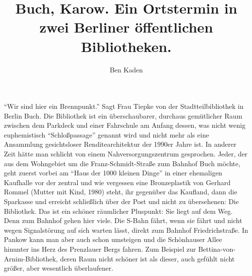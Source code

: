 \documentclass[a4paper,
fontsize=11pt,
oneside,
numbers=noperiodatend,
parskip=half-,
bibliography=totoc,
final
]{scrartcl}
\title{\LARGE{Buch, Karow. Ein Ortstermin in zwei Berliner öffentlichen Bibliotheken.}} %
\author{Ben Kaden} %
\date{}
\begin{document}
\maketitle
\thispagestyle{fancyplain} 


\enquote{Wir sind hier ein Brennpunkt.} Sagt Frau Tiepke von der
Stadtteilbibliothek in Berlin Buch. Die Bibliothek ist ein
überschaubarer, durchaus gemütlicher Raum zwischen dem Parkdeck und
einer Fahrschule am Anfang dessen, was nicht wenig euphemistisch
\enquote{Schloßpassage} genannt wird und nicht mehr als eine Ansammlung
gesichtsloser Renditearchitektur der 1990er Jahre ist. In anderer Zeit
hätte man schlicht von einem Nahversorgungszentrum gesprochen. Jeder,
der aus dem Wohngebiet um die Franz-Schmidt-Straße zum Bahnhof Buch
möchte, geht zuerst vorbei am \enquote{Haus der 1000 kleinen Dinge} in
einer ehemaligen Kaufhalle vor der zentral und wie vergessen eine
Bronzeplastik von Gerhard Rommel (Mutter mit Kind, 1980) steht, ihr
gegenüber das Kaufland, dann die Sparkasse und erreicht schließlich über
der Post und nicht zu übersehenen: Die Bibliothek. Das ist ein schöner
räumlicher Pluspunkt: Sie liegt auf dem Weg. Denn zum Bahnhof gehen hier
viele. Die S-Bahn fährt, wenn sie fährt und nicht wegen Signalstörung
auf sich warten lässt, direkt zum Bahnhof Friedrichstraße. In Pankow
kann man aber auch schon umsteigen und die Schönhauser Allee hinunter
ins Herz des Prenzlauer Bergs fahren. Zum Beispiel zur
Bettina-von-Arnim-Bibliothek, deren Raum nicht schöner ist als dieser,
auch gefühlt nicht größer, aber wesentlich überlaufener.
\end{document}
